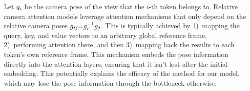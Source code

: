 





Let $g_i$ be the camera pose of the view that the $i$-th token belongs to. Relative camera attention models leverage attention mechanisms that only depend on the relative camera poses $g_{ij}{=}g_i^{-1}g_j$. 
This is typically achieved by 1)~mapping the query, key, and value vectors to an arbitrary global reference frame, 2)~performing attention there, and then 3)~mapping back the results to each token's own reference frame. This mechanism embeds the pose information directly into the attention layers, ensuring that it isn't lost after the initial embedding. This potentially explains the efficacy of the method for our model, which may lose the pose information through the bottleneck otherwise.
%

